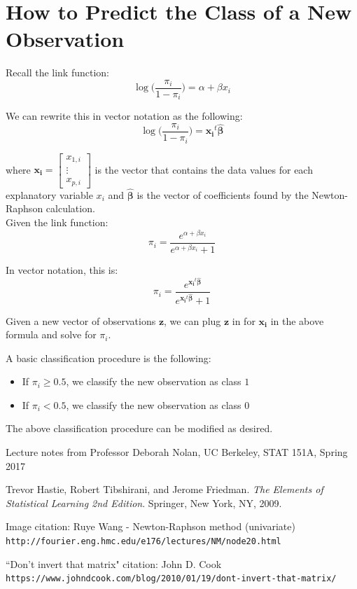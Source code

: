 \documentclass[12pt,timesnewroman,letterpaper]{article}
\begin{document}
\section{How to Predict the Class of a New Observation}

Recall the link function: 
$$
\log \big( \dfrac{\pi_i}{1-\pi_i} \big) = \alpha + \beta x_i
$$

\noindent We can rewrite this in vector notation as the following:
$$
\log \big( \dfrac{\pi_i}{1-\pi_i} \big) = \boldsymbol{x_i}^t \boldsymbol{\hat{\beta}}
$$

where $\boldsymbol{x_i} = \begin{bmatrix} 
    x_{1,i} \\
    \vdots \\
    x_{p,i}
    \end{bmatrix}$ is the vector that contains the data values for each explanatory variable $x_i$ and $\boldsymbol{\hat{\beta}}$ is the vector of coefficients found by the Newton-Raphson calculation.\\
    
\noindent Given the link function:
$$
\pi_i = \dfrac{e^{\alpha + \beta x_i}}{e^{\alpha + \beta x_i} + 1}
$$

\noindent In vector notation, this is:
$$
\pi_i = \dfrac{e^{\boldsymbol{x_i}^t \boldsymbol{\hat{\beta}}}}{e^{\boldsymbol{x_i}^t \boldsymbol{\hat{\beta}}} + 1}
$$

\noindent Given a new vector of observations $\boldsymbol{z}$, we can plug $\boldsymbol{z}$ in for $\boldsymbol{x_i}$ in the above formula and solve for $\pi_i$. 

A basic classification procedure is the following:

\begin{itemize}
    \item If $\pi_i \geq 0.5$, we classify the new observation as class $1$
    \item If $\pi_i < 0.5$, we classify the new observation as class $0$
\end{itemize}

\noindent The above classification procedure can be modified as desired.


\begin{thebibliography}{9}

Lecture notes from Professor Deborah Nolan, UC Berkeley, STAT 151A, Spring 2017

Trevor Hastie, Robert Tibshirani, and Jerome Friedman. 
\textit{The Elements of Statistical Learning 2nd Edition}. 
Springer, New York, NY, 2009.

Image citation: Ruye Wang - Newton-Raphson method (univariate)
\\\texttt{http://fourier.eng.hmc.edu/e176/lectures/NM/node20.html}

``Don't invert that matrix" citation: John D. Cook
\\\texttt{https://www.johndcook.com/blog/2010/01/19/dont-invert-that-matrix/}
\end{thebibliography}
\end{document}
